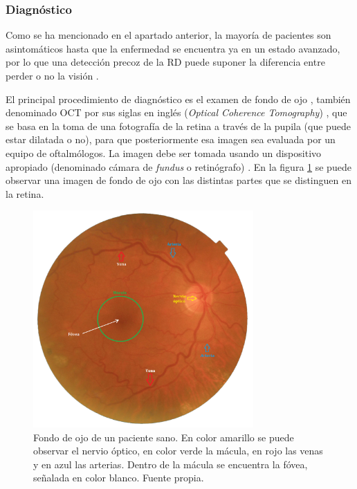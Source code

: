 \titlespacing{\subsubsection}{0pt}{0.25cm}{0.1cm}
\subsubsection{Diagnóstico}

Como se ha mencionado en el apartado anterior, la mayoría de pacientes son asintomáticos hasta que la enfermedad se encuentra ya en un estado avanzado, por lo que una detección precoz de la RD puede suponer la diferencia entre perder o no la visión \cite{diabetes:JDI}.

El principal procedimiento de diagnóstico es el examen de fondo de ojo \cite{retinopatia:Retinal_and_eye}, también denominado OCT por sus siglas en inglés (\textit{Optical Coherence Tomography}) \cite{retino:OMS}, que se basa en la toma de una fotografía de la retina a través de la pupila (que puede estar dilatada o no), para que posteriormente esa imagen sea evaluada por un equipo de oftalmólogos. La imagen debe ser tomada usando un dispositivo apropiado (denominado cámara de \textit{fundus} o retinógrafo) \cite{retino:tecnica_fundus}. En la figura \ref{fig:partes_retina} se puede observar una imagen de fondo de ojo con las distintas partes que se distinguen en la retina.

\begin{figure}[h]
    \centering
    \includegraphics[width=0.75\textwidth]{img/partes_retina.png}
    \caption{Fondo de ojo de un paciente sano. En color amarillo se puede observar el nervio óptico, en color verde la mácula, en rojo las venas y en azul las arterias. Dentro de la mácula se encuentra la fóvea, señalada en color blanco. Fuente propia.}
    \label{fig:partes_retina}
\end{figure}

